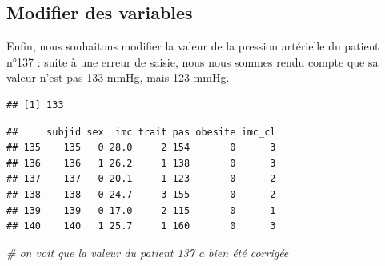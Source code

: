 \documentclass[
]{book}
\newenvironment{Shaded}{\begin{snugshade}}{\end{snugshade}}
\newcommand{\CommentTok}[1]{\textcolor[rgb]{0.56,0.35,0.01}{\textit{#1}}}
\newcommand{\DecValTok}[1]{\textcolor[rgb]{0.00,0.00,0.81}{#1}}
\newcommand{\DocumentationTok}[1]{\textcolor[rgb]{0.56,0.35,0.01}{\textbf{\textit{#1}}}}
\newcommand{\NormalTok}[1]{#1}
\newcommand{\OtherTok}[1]{\textcolor[rgb]{0.56,0.35,0.01}{#1}}
\newcommand{\SpecialCharTok}[1]{\textcolor[rgb]{0.81,0.36,0.00}{\textbf{#1}}}
\begin{document}
\subsection{Modifier des variables}\label{modifier-des-variables}

Enfin, nous souhaitons modifier la valeur de la pression artérielle du patient n°137 : suite à une erreur de saisie, nous nous sommes rendu compte que sa valeur n'est pas 133 mmHg, mais 123 mmHg.

\begin{Shaded}
\end{Shaded}

\begin{verbatim}
## [1] 133
\end{verbatim}

\begin{Shaded}
\end{Shaded}

\begin{verbatim}
##     subjid sex  imc trait pas obesite imc_cl
## 135    135   0 28.0     2 154       0      3
## 136    136   1 26.2     1 138       0      3
## 137    137   0 20.1     1 123       0      2
## 138    138   0 24.7     3 155       0      2
## 139    139   0 17.0     2 115       0      1
## 140    140   1 25.7     1 160       0      3
\end{verbatim}

\begin{Shaded}
\begin{Highlighting}[]
\CommentTok{\# on voit que la valeur du patient 137 a bien été corrigée}
\end{Highlighting}
\end{Shaded}
\end{document}
